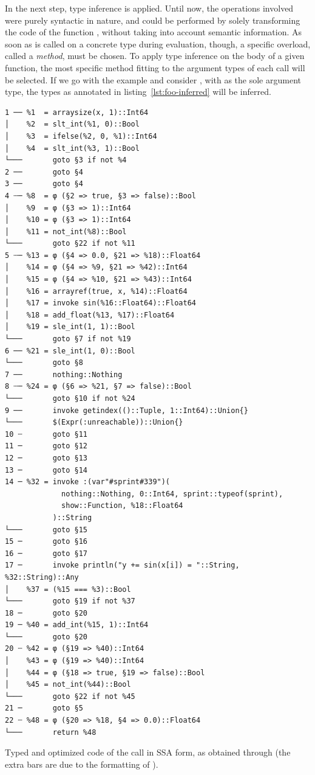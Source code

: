 In the next step, type inference is applied.  Until now, the operations involved were purely
syntactic in nature, and could be performed by solely transforming the code of the function
, without taking into account semantic information.  As soon as  is called on
a concrete type during evaluation, though, a specific overload, called a \emph{method}, must be
chosen.  To apply type inference on the body of a given function, the most specific method fitting
to the argument types of each call will be selected.  If we go with the example and consider
, with  as the sole argument type, the types as annotated in
listing~\ref{lst:foo-inferred} will be inferred.

\begin{lstfloat}[p]
  \begin{lstlisting}[style=lstfloat]
1 ── %1  = arraysize(x, 1)::Int64
│    %2  = slt_int(%1, 0)::Bool
│    %3  = ifelse(%2, 0, %1)::Int64
│    %4  = slt_int(%3, 1)::Bool
└───       goto §3 if not %4
2 ──       goto §4
3 ──       goto §4
4 ┄─ %8  = φ (§2 => true, §3 => false)::Bool
│    %9  = φ (§3 => 1)::Int64
│    %10 = φ (§3 => 1)::Int64
│    %11 = not_int(%8)::Bool
└───       goto §22 if not %11
5 ┄─ %13 = φ (§4 => 0.0, §21 => %18)::Float64
│    %14 = φ (§4 => %9, §21 => %42)::Int64
│    %15 = φ (§4 => %10, §21 => %43)::Int64
│    %16 = arrayref(true, x, %14)::Float64
│    %17 = invoke sin(%16::Float64)::Float64
│    %18 = add_float(%13, %17)::Float64
│    %19 = sle_int(1, 1)::Bool
└───       goto §7 if not %19
6 ── %21 = sle_int(1, 0)::Bool
└───       goto §8
7 ──       nothing::Nothing
8 ┄─ %24 = φ (§6 => %21, §7 => false)::Bool
└───       goto §10 if not %24
9 ──       invoke getindex(()::Tuple, 1::Int64)::Union{}
└───       $(Expr(:unreachable))::Union{}
10 ┄       goto §11
11 ─       goto §12
12 ─       goto §13
13 ─       goto §14
14 ─ %32 = invoke :(var"#sprint#339")(
             nothing::Nothing, 0::Int64, sprint::typeof(sprint), 
             show::Function, %18::Float64
           )::String
└───       goto §15
15 ─       goto §16
16 ─       goto §17
17 ─       invoke println("y += sin(x[i]) = "::String, %32::String)::Any
│    %37 = (%15 === %3)::Bool
└───       goto §19 if not %37
18 ─       goto §20
19 ─ %40 = add_int(%15, 1)::Int64
└───       goto §20
20 ┄ %42 = φ (§19 => %40)::Int64
│    %43 = φ (§19 => %40)::Int64
│    %44 = φ (§18 => true, §19 => false)::Bool
│    %45 = not_int(%44)::Bool
└───       goto §22 if not %45
21 ─       goto §5
22 ┄ %48 = φ (§20 => %18, §4 => 0.0)::Float64
└───       return %48
\end{lstlisting}
  \caption{Typed and optimized code of the call \protect{} in SSA form, as obtained
    through \protect{} (the extra bars are due to the formatting of
    \protect{}).\label{lst:foo-typed}}
\end{lstfloat}

